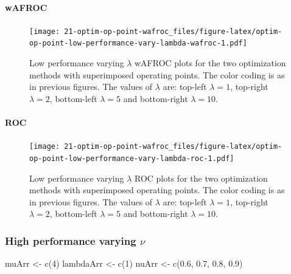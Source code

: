 \documentclass[
]{book}
\newenvironment{Shaded}{\begin{snugshade}}{\end{snugshade}}
\newcommand{\DecValTok}[1]{\textcolor[rgb]{0.00,0.00,0.81}{#1}}
\newcommand{\FloatTok}[1]{\textcolor[rgb]{0.00,0.00,0.81}{#1}}
\newcommand{\FunctionTok}[1]{\textcolor[rgb]{0.00,0.00,0.00}{#1}}
\newcommand{\NormalTok}[1]{#1}
\newcommand{\OtherTok}[1]{\textcolor[rgb]{0.56,0.35,0.01}{#1}}
\begin{document}
\hypertarget{wafroc-8}{%
\paragraph{wAFROC}\label{wafroc-8}}

\begin{figure}
\centering
\texttt{[image: 21-optim-op-point-wafroc\_files/figure-latex/optim-op-point-low-performance-vary-lambda-wafroc-1.pdf]}
\caption{\label{fig:optim-op-point-low-performance-vary-lambda-wafroc}Low performance varying \(\lambda\) wAFROC plots for the two optimization methods with superimposed operating points. The color coding is as in previous figures. The values of \(\lambda\) are: top-left \(\lambda = 1\), top-right \(\lambda = 2\), bottom-left \(\lambda = 5\) and bottom-right \(\lambda = 10\).}
\end{figure}

\hypertarget{roc-8}{%
\paragraph{ROC}\label{roc-8}}

\begin{figure}
\centering
\texttt{[image: 21-optim-op-point-wafroc\_files/figure-latex/optim-op-point-low-performance-vary-lambda-roc-1.pdf]}
\caption{\label{fig:optim-op-point-low-performance-vary-lambda-roc}Low performance varying \(\lambda\) ROC plots for the two optimization methods with superimposed operating points. The color coding is as in previous figures. The values of \(\lambda\) are: top-left \(\lambda = 1\), top-right \(\lambda = 2\), bottom-left \(\lambda = 5\) and bottom-right \(\lambda = 10\).}
\end{figure}

\hypertarget{optim-op-point-high-performance-vary-nu}{%
\subsubsection{\texorpdfstring{High performance varying \(\nu\)}{High performance varying \textbackslash nu}}\label{optim-op-point-high-performance-vary-nu}}

\begin{Shaded}
\begin{Highlighting}[]
\NormalTok{muArr }\OtherTok{\textless{}{-}} \FunctionTok{c}\NormalTok{(}\DecValTok{4}\NormalTok{)}
\NormalTok{lambdaArr }\OtherTok{\textless{}{-}} \FunctionTok{c}\NormalTok{(}\DecValTok{1}\NormalTok{)}
\NormalTok{nuArr }\OtherTok{\textless{}{-}} \FunctionTok{c}\NormalTok{(}\FloatTok{0.6}\NormalTok{, }\FloatTok{0.7}\NormalTok{, }\FloatTok{0.8}\NormalTok{, }\FloatTok{0.9}\NormalTok{)}
\end{Highlighting}
\end{Shaded}
\end{document}
